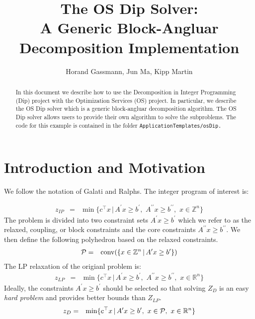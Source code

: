\documentclass[11pt]{article}
\begin{document}
\title{The OS Dip Solver:\\
A Generic Block-Angluar Decomposition Implementation}
\vskip 2in
\author{Horand Gassmann, Jun Ma,  Kipp Martin}
\maketitle

\begin{abstract}
In this document we describe how to use the Decomposition in Integer Programming
(Dip) project with the Optimization Services (OS) project. In particular,  we
describe the OS Dip solver which is  a generic block-angluar
decomposition algorithm. The OS Dip solver allows users to provide their own
algorithm to solve the subproblems.  The code for this example is contained 
in the folder {\tt ApplicationTemplates/osDip.}




\end{abstract}


\newpage
{}


 

\newpage

\section{Introduction and Motivation}

We follow the notation of Galati and Ralphs. The integer program of interest is:

\begin{eqnarray}
z_{IP} &=&  \min  \{c^{\top} x \, | \, A^{\prime} x \ge b^{\prime},  \,\, 
A^{\prime \prime} x \ge b^{\prime \prime}, \, \, x \in \mathbb{Z}^{n}  \}
\end{eqnarray}
The problem is divided into two constraint sets $A^{\prime} x \ge b^{\prime}$
which we refer to as the relaxed, coupling, or block constraints and the core
constraints $A^{\prime \prime} x \ge b^{\prime \prime}.$  We then define the
following polyhedron based on the relaxed constraints.
\begin{eqnarray}
{\cal P} &=&  {\rm conv} ( \{ x \in \mathbb{Z}^{n} \, | \, A^{\prime} x \ge
b^{\prime}
\})
\end{eqnarray}
 The LP relaxation of the origianl problem is:
\begin{eqnarray}
z_{LP} &=&  \min  \{c^{\top} x \, | \, A^{\prime} x \ge b^{\prime},  \,\, 
A^{\prime \prime} x \ge b^{\prime \prime}, \, \, x \in \mathbb{R}^{n}  \}
\end{eqnarray}
Ideally,  the constraints $A^{\prime} x \ge b^{\prime}$
should be selected so that solving $Z_{D}$ is an easy {\it hard problem} and
provides better bounds than $Z_{LP}.$
\begin{eqnarray}
z_{D} &=&  \min  \{c^{\top} x \, | \, A^{\prime} x \ge b^{\prime},  \,\, 
x \in {\cal P}, \, \, x \in \mathbb{R}^{n}  \}
\end{eqnarray}
\end{document}

